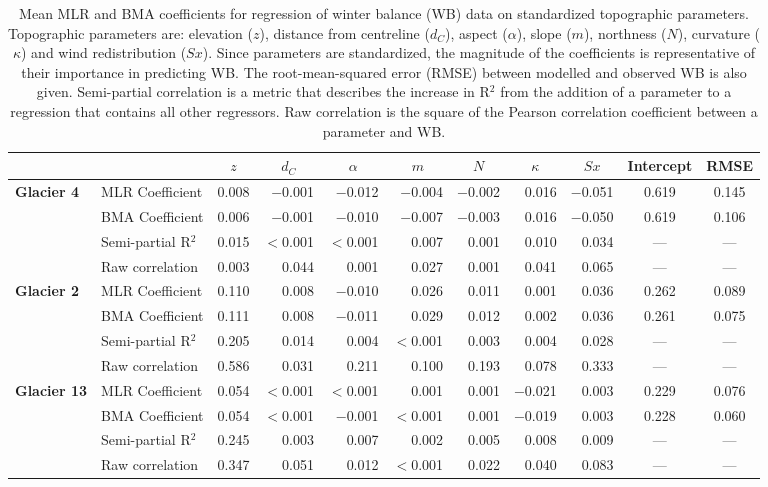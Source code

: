 \documentclass{sfuthesis}
\newcommand{\params}{Topographic parameters are: elevation ($z$), distance from centreline ($d_C$), aspect ($\alpha$), slope ($m$), northness ($N$), curvature ($\kappa$) and wind redistribution ($Sx$). }
\begin{document}
\begin{table}
\centering
\caption[Mean MLR and BMA coefficients for regression of winter balance (WB) data on standardized topographic parameters]{Mean MLR and BMA coefficients for regression of winter balance (WB) data on standardized topographic parameters. \params  Since parameters are standardized, the magnitude of the coefficients is representative of their importance in predicting WB. The root-mean-squared error (RMSE) between modelled and observed WB is also given. Semi-partial correlation is a metric that describes the increase in R$^2$ from the addition of a parameter to a regression that contains all other regressors. Raw correlation is the square of the Pearson correlation coefficient between a parameter and WB.}
\label{tab:MLRmeancoeff}
\begin{tabular}{ll|rrrrrrrc|c}
 &  & \multicolumn{1}{c}{$z$} & \multicolumn{1}{c}{$d_C$} & \multicolumn{1}{c}{$\alpha$} & \multicolumn{1}{c}{$m$} & \multicolumn{1}{c}{$N$} & \multicolumn{1}{c}{$\kappa$} & \multicolumn{1}{c}{$Sx$} & Intercept & RMSE \\ \hline \hline
\multirow{4}{*}{\textbf{Glacier 4}} & MLR Coefficient & 0.008 & $-$0.001 & $-$0.012 & $-$0.004 & $-$0.002 & 0.016 & $-$0.051 & 0.619 & 0.145 \\
 & BMA Coefficient & 0.006 & $-$0.001 & $-$0.010 & $-$0.007 & $-$0.003 & 0.016 & $-$0.050 & 0.619 & 0.106 \\
 & Semi-partial R$^2$ & 0.015 & $<$0.001 & $<$0.001 & 0.007 & 0.001 & 0.010 & 0.034 & --- & --- \\
 & Raw correlation & 0.003 & 0.044 & 0.001 & 0.027 & 0.001 & 0.041 & 0.065 & --- & --- \\ \hline
\multirow{4}{*}{\textbf{Glacier 2}} & MLR Coefficient & 0.110 & 0.008 & $-$0.010 & 0.026 & 0.011 & 0.001 & 0.036 & 0.262 & 0.089 \\
 & BMA Coefficient & 0.111 & 0.008 & $-$0.011 & 0.029 & 0.012 & 0.002 & 0.036 & 0.261 & 0.075 \\
 & Semi-partial R$^2$ & 0.205 & 0.014 & 0.004 & $<$0.001 & 0.003 & 0.004 & 0.028 & --- & --- \\
 & Raw correlation & 0.586 & 0.031 & 0.211 & 0.100 & 0.193 & 0.078 & 0.333 & --- & --- \\ \hline
\multirow{4}{*}{\textbf{Glacier 13}} & MLR Coefficient & 0.054 & $<$0.001 & $<$0.001 & 0.001 & 0.001 & $-$0.021 & 0.003 & 0.229 & 0.076 \\
 & BMA Coefficient & 0.054 & $<$0.001 & $-$0.001 & $<$0.001 & 0.001 & $-$0.019 & 0.003 & 0.228 & 0.060 \\
 & Semi-partial R$^2$ & 0.245 & 0.003 & 0.007 & 0.002 & 0.005 & 0.008 & 0.009 & --- & --- \\
 & Raw correlation & 0.347 & 0.051 & 0.012 & $<$0.001 & 0.022 & 0.040 & 0.083 & --- & ---
\end{tabular}
\end{table}
\end{document}
